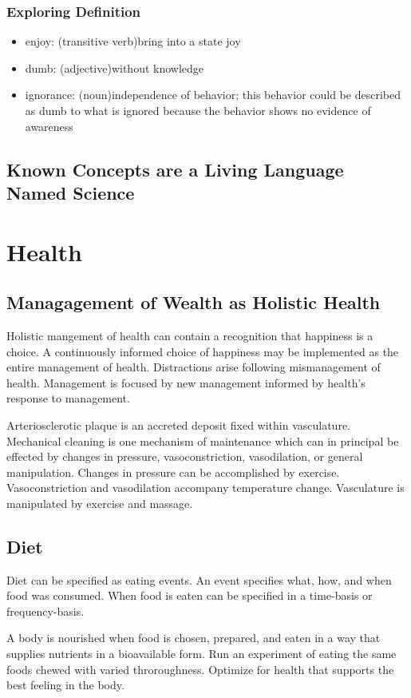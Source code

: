 \documentclass{book}
\begin{document}
\subsubsection{Exploring Definition}
\begin{itemize}
	\item enjoy: (transitive verb)bring into a state joy
	\item dumb: (adjective)without knowledge
	\item ignorance: (noun)independence of behavior; this behavior could be described as dumb to what is ignored because the behavior shows no evidence of awareness
\end{itemize}

\subsection{Known Concepts are a Living Language Named Science}

\section{Health}
\subsection{Managagement of Wealth as Holistic Health}
Holistic mangement of health can contain a recognition that happiness is a choice.
A continuously informed choice of happiness may be implemented as the entire management of health.
Distractions arise following mismanagement of health.
Management is focused by new management informed by health's response to management.

Arteriosclerotic plaque is an accreted deposit fixed within vasculature.
Mechanical cleaning is one mechanism of maintenance which can in principal be effected by changes in pressure, vasoconstriction, vasodilation, or general manipulation.
Changes in pressure can be accomplished by exercise.
Vasoconstriction and vasodilation accompany temperature change.
Vasculature is manipulated by exercise and massage.

\subsection{Diet}
Diet can be specified as eating events.
An event specifies what, how, and when food was consumed.
When food is eaten can be specified in a time-basis or frequency-basis.

A body is nourished when food is chosen, prepared, and eaten in a way that supplies nutrients in a bioavailable form.
Run an experiment of eating the same foods chewed with varied throroughness.
Optimize for health that supports the best feeling in the body.
\end{document}

